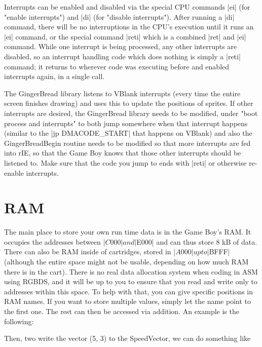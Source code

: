\documentclass[11pt]{book}
\begin{document}
Interrupts can be enabled and disabled via the special CPU commands |ei| (for "enable interrupts") and |di| (for "disable interrupts"). After running a |di| command, there will be no interruptions in the CPU's execution until it runs an |ei| command, or the special command |reti| which is a combined |ret| and |ei| command. While one interrupt is being processed, any other interrupts are disabled, so an interrupt handling code which does nothing is simply a |reti| command; it returns to wherever code was executing before and enabled interrupts again, in a single call. 

The GingerBread library listens to VBlank interrupts (every time the entire screen finishes drawing) and uses this to update the positions of sprites. If other interrupts are desired, the GingerBread library needs to be modified, under "boot process and interrupts" to both jump somewhere when that interrupt happens (similar to the |jp DMACODE_START| that happens on VBlank) and also the GingerBreadBegin routine needs to be modified so that more interrupts are fed into rIE, so that the Game Boy knows that those other interrupts should be listened to. Make sure that the code you jump to ends with |reti| or otherwise re-enable interrupts.

\section{RAM}
\label{ram}
The main place to store your own run time data is in the Game Boy’s RAM. It occupies the addresses between |$C000| and |$E000| and can thus store 8 kB of data. There can also be RAM inside of cartridges, stored in |$A000| up to |$BFFF| (although the entire space might not be usable, depending on how much RAM there is in the cart). There is no real data allocation system when coding in ASM using RGBDS, and it will be up to you to ensure that you read and write only to addresses within this space. To help with that, you can give specific positions in RAM names. If you want to store multiple values, simply let the name point to the first one. The rest can then be accessed via addition. An example is the following:


Then, two write the vector (5, 3) to the SpeedVector, we can do something like 
\end{document}
